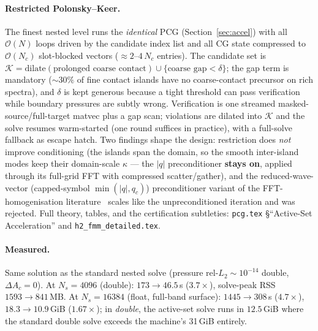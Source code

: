 \documentclass[11pt,a4paper]{article}
\newcommand{\Order}{\mathcal{O}}
\newcommand{\abs}[1]{\left\lvert #1 \right\rvert}
\begin{document}
\paragraph{Restricted Polonsky--Keer.} The finest nested level runs the
\emph{identical} PCG (Section~\ref{sec:accel}) with all $\Order(N)$ loops
driven by the candidate index list and all CG state compressed to
$\Order(N_c)$ slot-blocked vectors ($\approx2$--$4\,N_c$ entries). The
candidate set is $\mathcal{K}=\mathrm{dilate}(\text{prolonged coarse
contact})\cup\{\text{coarse gap}<\delta\}$; the gap term is mandatory
($\sim\!30\%$ of fine contact islands have no coarse-contact precursor on
rich spectra), and $\delta$ is kept generous because a tight threshold can
pass verification while boundary pressures are subtly wrong. Verification is
one streamed masked-source/full-target matvec plus a gap scan; violations
are dilated into $\mathcal{K}$ and the solve resumes warm-started (one round
suffices in practice), with a full-solve fallback as escape hatch. Two
findings shape the design: restriction does \emph{not} improve conditioning
(the islands span the domain, so the smooth inter-island modes keep their
domain-scale $\kappa$ --- the $\abs{q}$ preconditioner \textbf{stays on},
applied through its full-grid FFT with compressed scatter/gather), and the
reduced-wave-vector (capped-symbol $\min(\abs{q},q_c)$) preconditioner
variant of the FFT-homogenisation literature~\cite{GierdenEtAl2022} scales
like the unpreconditioned iteration and was rejected. Full theory, tables,
and the certification subtleties: \texttt{pcg.tex} \S``Active-Set
Acceleration'' and \texttt{h2\_fmm\_detailed.tex}.

\paragraph{Measured.} Same solution as the standard nested solve (pressure
rel-$L_2\sim10^{-14}$ double, $\Delta A_c=0$). At $N_s=4096$ (double):
$173\to46.5$\,s ($3.7\times$), solve-peak RSS $1593\to841$\,MB. At
$N_s=16384$ (float, full-band surface): $1445\to308$\,s ($4.7\times$),
$18.3\to10.9$\,GiB ($1.67\times$); in \emph{double}, the active-set solve
runs in $12.5$\,GiB where the standard double solve exceeds the machine's
31\,GiB entirely.
\end{document}
